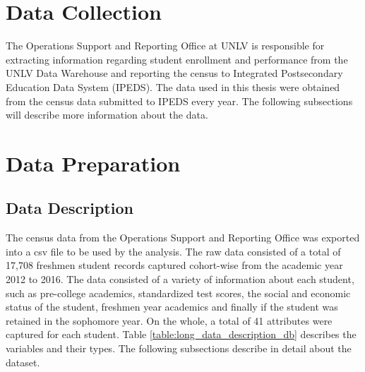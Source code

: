 \documentclass[11pt,openright]{report}
\begin{document}
\section{Data Collection}

The Operations Support and Reporting Office at UNLV is responsible for extracting information regarding student enrollment and performance from the UNLV Data Warehouse and reporting the census to Integrated Postsecondary Education Data System (IPEDS). The data used in this thesis were obtained from the census data submitted to IPEDS every year. The following subsections will describe more information about the data.

\section {Data Preparation}
\subsection{Data Description}
The census data from the Operations Support and Reporting Office was exported into a csv file to be used by the analysis. The raw data consisted of a total of 17,708 freshmen student records captured cohort-wise from the academic year 2012 to 2016. The data consisted of a variety of information about each student, such as pre-college academics, standardized test scores, the social and economic status of the student, freshmen year academics and finally if the student was retained in the sophomore year. On the whole, a total of 41 attributes were captured for each student. Table \ref{table:long_data_description_db} describes the variables and their types. The following subsections describe in detail about the dataset. 
\end{document}
